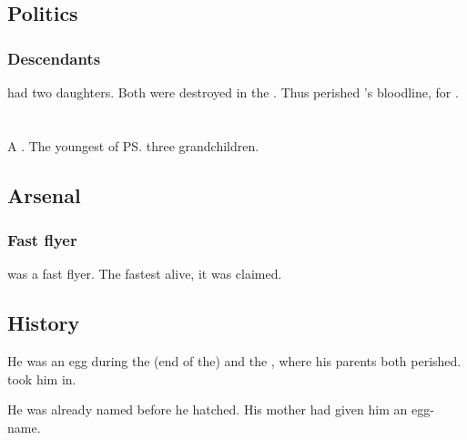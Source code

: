 \subsection{Politics}





\subsubsection{Descendants}
\Nexagglachel had two daughters.
Both were destroyed in the .
Thus perished 's bloodline, for . 














\section{\Rathyon}
\index{\Rathyon}
A \dragon. 
The youngest of \ps{\QuessanthIshnaruchaefir} three grandchildren. 









\subsection{Arsenal}
\subsubsection{Fast flyer}
\Rathyon{} was a fast flyer. 
The fastest \dragon{} alive, it was claimed. 









\subsection{History}
He was an egg during the (end of the) \Secondbanewar{} and the \SecondShrouding{}, where his parents both perished. 
\Ishnaruchaefir{} took him in. 

He was already named before he hatched. 
His mother had given him an egg-name. 

